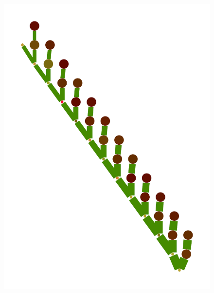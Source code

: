 \documentclass[a4paper,10pt]{article}
\begin{document}
\begin{figure}
{    \includegraphics[scale=.14]{./figures/6-4-vine-induced-4.pdf}
}
\end{figure}
\end{document}

